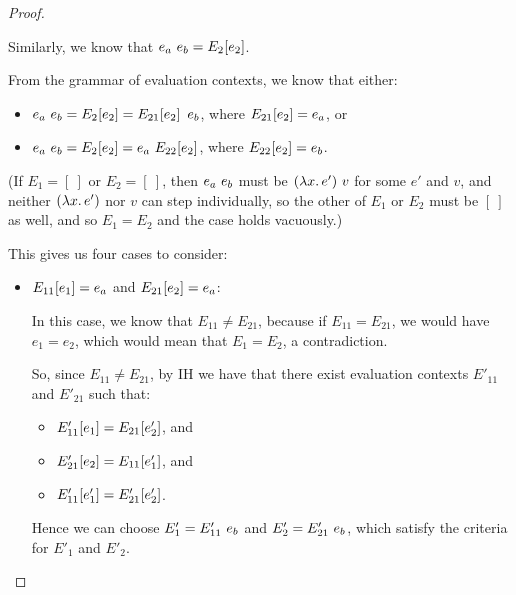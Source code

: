\begin{proof}
\begin{itemize}
    Similarly, we know that $e_a~e_b = E_2\hspace{-0.5mm}\left[e_2\right]$.

    From the grammar of evaluation contexts, we know that either:
    \begin{itemize}
    \item $e_a~e_b = E_2\hspace{-0.5mm}\left[e_2\right] =
      E_{21}\hspace{-0.5mm}\left[e_2\right]~e_b$, where
      $E_{21}\hspace{-0.5mm}\left[e_2\right] = e_a$, or
    \item $e_a~e_b = E_2\hspace{-0.5mm}\left[e_2\right] =
      e_a~E_{22}\hspace{-0.5mm}\left[e_2\right]$, where
      $E_{22}\hspace{-0.5mm}\left[e_2\right] = e_b$.
    \end{itemize}

    (If $E_1 = [~]$ or $E_2 = [~]$, then $e_a~e_b$ must be
    $(\lambda x.\,e')~v$ for some $e'$ and $v$, and neither
    $(\lambda x.\,e')$ nor $v$ can step individually, so the other of
    $E_1$ or $E_2$ must be $[~]$ as well, and so $E_1 = E_2$ and the
    case holds vacuously.)

    This gives us four cases to consider:

    \begin{itemize}
    \item $E_{11}\hspace{-0.5mm}\left[e_1\right] = e_a$ and $E_{21}\hspace{-0.5mm}\left[e_2\right] =
      e_a$:

      In this case, we know that $E_{11} \neq E_{21}$, because if
      $E_{11} = E_{21}$, we would have $e_1 = e_2$, which would mean
      that $E_1 = E_2$, a contradiction.

      So, since $E_{11} \neq E_{21}$, by IH we have that there exist
      evaluation contexts $E'_{11}$ and $E'_{21}$ such that:
      \begin{itemize}
      \item $E'_{11}\hspace{-0.5mm}\left[e_1\right] = E_{21}\hspace{-0.5mm}\left[e'_2\right]$, and
      \item $E'_{21}\hspace{-0.5mm}\left[e_2\right] = E_{11}\hspace{-0.5mm}\left[e'_1\right]$, and
      \item $E'_{11}\hspace{-0.5mm}\left[e'_1\right] = E'_{21}\hspace{-0.5mm}\left[e'_2\right]$.
      \end{itemize}

      Hence we can choose $E'_1 = E'_{11}~e_b$ and $E'_2 =
      E'_{21}~e_b$, which satisfy the criteria for $E'_1$
      and $E'_2$.



\end{itemize}
\end{itemize}
\end{proof}

